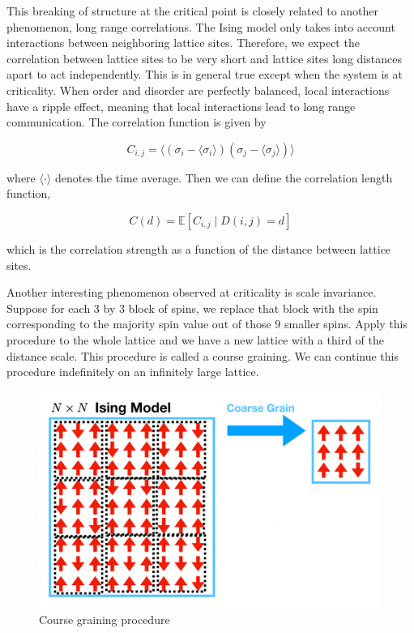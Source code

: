 \documentclass{article}
\begin{document}
This breaking of structure at the critical point is closely related to another phenomenon, long range correlations. The Ising model only takes into account
interactions between neighboring lattice sites. Therefore, we expect the correlation between lattice sites to be very short and lattice sites
long distances apart to act independently. This is in general true except when the system is at criticality. When order and disorder
are perfectly balanced, local interactions have a ripple effect, meaning that local interactions lead to long range communication. The correlation function is given by

\begin{equation}
    C_{i,j} = \langle (\sigma_i - \langle \sigma_i \rangle)(\sigma_j - \langle \sigma_j \rangle) \rangle
\end{equation}

where $\langle \cdot \rangle$ denotes the time average. Then we can define the correlation length function,

\begin{equation}
    C(d) = \mathbb{E} \left[ C_{i,j} \mid D(i,j) = d \right]
\end{equation}

which is the correlation strength as a function of the distance between lattice sites.

Another interesting phenomenon observed at criticality is scale invariance. Suppose for each 3 by 3 block of spins, we replace that block
with the spin corresponding to the majority spin value out of those 9 smaller spins. Apply this procedure to the whole lattice and we have
a new lattice with a third of the distance scale. This procedure is called a course graining. We can continue this procedure indefinitely on an 
infinitely large lattice.

\begin{figure}[ht]
    \includegraphics[width=\columnwidth]{diagrams/course_grain.png}
    \caption{Course graining procedure}
    \label{fig:6}
\end{figure}
\end{document}

